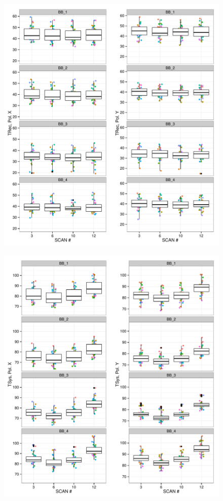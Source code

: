 \documentclass[10pt,]{article}
\begin{document}
\begin{figure}[htbp]
\centering
\includegraphics{QA0rep_files/figure-latex/unnamed-chunk-9-1.pdf}
\caption{}
\end{figure}

\begin{figure}[htbp]
\centering
\includegraphics{QA0rep_files/figure-latex/unnamed-chunk-10-1.pdf}
\caption{}
\end{figure}
\end{document}
